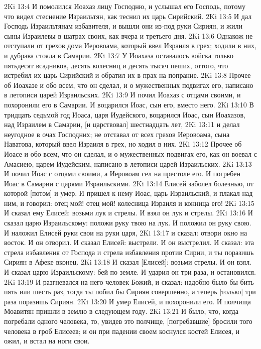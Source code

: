 2Ki 13:4  И помолился Иоахаз лицу Господню, и услышал его Господь, потому что видел стеснение Израильтян, как теснил их царь Сирийский.
2Ki 13:5  И дал Господь Израильтянам избавителя, и вышли они из-под руки Сириян, и жили сыны Израилевы в шатрах своих, как вчера и третьего дня.
2Ki 13:6  Однакож не отступали от грехов дома Иеровоама, который ввел Израиля в грех; ходили в них, и дубрава стояла в Самарии.
2Ki 13:7  У Иоахаза оставалось войска только пятьдесят всадников, десять колесниц и десять тысяч пеших, оттого, что истребил их царь Сирийский и обратил их в прах на попрание.
2Ki 13:8  Прочее об Иоахазе и обо всем, что он сделал, и о мужественных подвигах его, написано в летописи царей Израильских.
2Ki 13:9  И почил Иоахаз с отцами своими, и похоронили его в Самарии. И воцарился Иоас, сын его, вместо него.
2Ki 13:10  В тридцать седьмой год Иоаса, царя Иудейского, воцарился Иоас, сын Иоахазов, над Израилем в Самарии, [и царствовал] шестнадцать лет,
2Ki 13:11  и делал неугодное в очах Господних; не отставал от всех грехов Иеровоама, сына Наватова, который ввел Израиля в грех, но ходил в них.
2Ki 13:12  Прочее об Иоасе и обо всем, что он сделал, и о мужественных подвигах его, как он воевал с Амасиею, царем Иудейским, написано в летописи царей Израильских.
2Ki 13:13  И почил Иоас с отцами своими, а Иеровоам сел на престоле его. И погребен Иоас в Самарии с царями Израильскими.
2Ki 13:14  Елисей заболел болезнью, от которой [потом] и умер. И пришел к нему Иоас, царь Израильский, и плакал над ним, и говорил: отец мой! отец мой! колесница Израиля и конница его!
2Ki 13:15  И сказал ему Елисей: возьми лук и стрелы. И взял он лук и стрелы.
2Ki 13:16  И сказал царю Израильскому: положи руку твою на лук. И положил он руку свою. И наложил Елисей руки свои на руки царя,
2Ki 13:17  и сказал: отвори окно на восток. И он отворил. И сказал Елисей: выстрели. И он выстрелил. И сказал: эта стрела избавления от Господа и стрела избавления против Сирии, и ты поразишь Сириян в Афеке вконец.
2Ki 13:18  И сказал [Елисей]: возьми стрелы. И он взял. И сказал царю Израильскому: бей по земле. И ударил он три раза, и остановился.
2Ki 13:19  И разгневался на него человек Божий, и сказал: надобно было бы бить пять или шесть раз, тогда ты побил бы Сириян совершенно, а теперь [только] три раза поразишь Сириян.
2Ki 13:20  И умер Елисей, и похоронили его. И полчища Моавитян пришли в землю в следующем году.
2Ki 13:21  И было, что, когда погребали одного человека, то, увидев это полчище, [погребавшие] бросили того человека в гроб Елисеев; и он при падении своем коснулся костей Елисея, и ожил, и встал на ноги свои.
